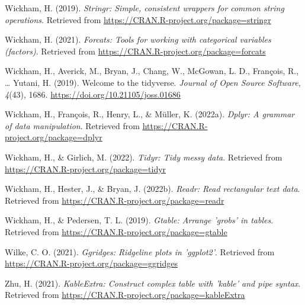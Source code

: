 \documentclass[
  english,
  man,floatsintext]{apa6}
\begin{document}
\leavevmode\hypertarget{ref-R-stringr}{}%
Wickham, H. (2019). \emph{Stringr: Simple, consistent wrappers for common string operations}. Retrieved from \url{https://CRAN.R-project.org/package=stringr}

\leavevmode\hypertarget{ref-R-forcats}{}%
Wickham, H. (2021). \emph{Forcats: Tools for working with categorical variables (factors)}. Retrieved from \url{https://CRAN.R-project.org/package=forcats}

\leavevmode\hypertarget{ref-R-tidyverse}{}%
Wickham, H., Averick, M., Bryan, J., Chang, W., McGowan, L. D., François, R., \ldots{} Yutani, H. (2019). Welcome to the tidyverse. \emph{Journal of Open Source Software}, \emph{4}(43), 1686. \url{https://doi.org/10.21105/joss.01686}

\leavevmode\hypertarget{ref-R-dplyr}{}%
Wickham, H., François, R., Henry, L., \& Müller, K. (2022a). \emph{Dplyr: A grammar of data manipulation}. Retrieved from \url{https://CRAN.R-project.org/package=dplyr}

\leavevmode\hypertarget{ref-R-tidyr}{}%
Wickham, H., \& Girlich, M. (2022). \emph{Tidyr: Tidy messy data}. Retrieved from \url{https://CRAN.R-project.org/package=tidyr}

\leavevmode\hypertarget{ref-R-readr}{}%
Wickham, H., Hester, J., \& Bryan, J. (2022b). \emph{Readr: Read rectangular text data}. Retrieved from \url{https://CRAN.R-project.org/package=readr}

\leavevmode\hypertarget{ref-R-gtable}{}%
Wickham, H., \& Pedersen, T. L. (2019). \emph{Gtable: Arrange 'grobs' in tables}. Retrieved from \url{https://CRAN.R-project.org/package=gtable}

\leavevmode\hypertarget{ref-R-ggridges}{}%
Wilke, C. O. (2021). \emph{Ggridges: Ridgeline plots in 'ggplot2'}. Retrieved from \url{https://CRAN.R-project.org/package=ggridges}

\leavevmode\hypertarget{ref-R-kableExtra}{}%
Zhu, H. (2021). \emph{KableExtra: Construct complex table with 'kable' and pipe syntax}. Retrieved from \url{https://CRAN.R-project.org/package=kableExtra}

\endgroup
\end{document}
